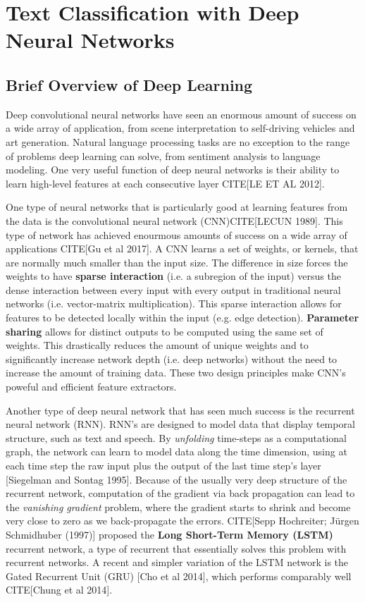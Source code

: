 
\chapter{Text Classification with Deep Neural Networks}\label{TXT-CLASS}

\section{Brief Overview of Deep Learning}
Deep convolutional neural networks have seen an enormous amount of success on a wide
array of application, from scene interpretation to self-driving vehicles and art generation.
Natural language processing tasks are no exception to the range of problems
deep learning can solve, from sentiment analysis to language modeling. One very useful function of deep neural networks
is their ability to learn high-level features at each consecutive layer CITE[LE ET AL 2012].

One type of neural networks that is particularly good at learning features from the data is the convolutional neural network (CNN)CITE[LECUN 1989].
This type of network has achieved enourmous amounts of success on a wide array of applications CITE[Gu et al 2017]. A CNN learns a set of weights, or kernels, that are normally much smaller than the input size.
The difference in size forces the weights to have \textbf{sparse interaction} (i.e. a subregion of the input) versus the dense interaction
between every input with every output in traditional neural networks (i.e. vector-matrix multiplication). This sparse interaction
allows for features to be detected locally within the input (e.g. edge detection).
\textbf{Parameter sharing} allows for distinct outputs to be computed using the same set of weights. This drastically reduces
the amount of unique weights and to significantly increase network depth (i.e. deep networks) without the need
to increase the amount of training data.
These two design principles make CNN's poweful and efficient feature extractors.

Another type of deep neural network that has seen much success is the recurrent neural network (RNN). RNN's are designed to model data that display temporal structure, such as text and speech. By \textit{unfolding}
time-steps as a computational graph, the network can learn to model data along the time dimension, using at each time step the
raw input plus the output of the last time step's layer [Siegelman and Sontag 1995]. Because of the usually very deep structure of
the recurrent network, computation of the gradient via back propagation can lead to the \textit{vanishing gradient} problem, where the gradient
starts to shrink and become very close to zero as we back-propagate the errors. CITE[Sepp Hochreiter; Jürgen Schmidhuber (1997)] proposed
the \textbf{Long Short-Term Memory (LSTM)} recurrent network, a type of recurrent that essentially solves this problem with recurrent networks.
A recent and simpler variation of the LSTM network is the Gated Recurrent Unit (GRU) [Cho et al 2014], which performs comparably well CITE[Chung et al 2014].



